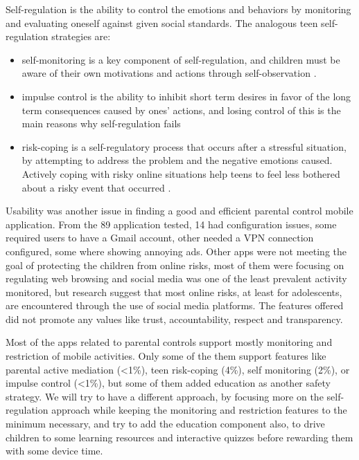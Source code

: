 Self-regulation is the ability to control the emotions and behaviors by monitoring and evaluating oneself against given social standards. The analogous teen self-regulation strategies are:

\begin{itemize}
\item self-monitoring is a key component of self-regulation, and children must be aware of their own motivations and actions through self-observation \citep{bandura1991social}.
\item impulse control is the ability to inhibit short term desires in favor of the long term consequences caused by ones' actions, and losing control of this is the main reasons why self-regulation fails \parencite{baumeister1996self}
\item risk-coping is a self-regulatory process that occurs after a stressful situation, by attempting to address the problem and the negative emotions caused. Actively coping with risky online situations help teens to feel less bothered about a risky event that occurred \citep{d2013cope}.
\end{itemize}

Usability was another issue in finding a good and efficient parental control mobile application. From the 89 application tested, 14 had configuration issues, some required users to have a Gmail account, other needed a VPN connection configured, some where showing annoying ads. Other apps were not meeting the goal of protecting the children from online risks, most of them were focusing on regulating web browsing and social media was one of the least prevalent activity monitored, but research suggest that most online risks, at least for adolescents, are encountered through the use of social media platforms. The features offered did not promote any values like trust, accountability, respect and transparency.

Most of the apps related to parental controls support mostly monitoring and restriction of mobile activities. Only some of the them support features like parental active mediation (<1\%), teen risk-coping (4\%), self monitoring (2\%), or impulse control (<1\%), but some of them added education as another safety strategy. We will try to have a different approach, by focusing more on the self-regulation approach while keeping the monitoring and restriction features to the minimum necessary, and try to add the education component also, to drive children to some learning resources and interactive quizzes before rewarding them with some device time.

